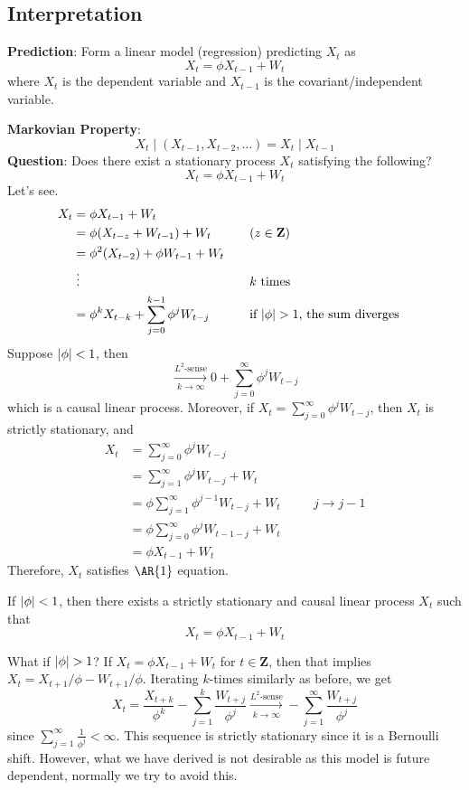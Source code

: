 \subsection*{Interpretation}
\textbf{Prediction}: Form a linear model (regression)
predicting $ X_t $ as
\[ X_t=\phi X_{t-1}+W_t \]
where $ X_t $ is the dependent variable
and $ X_{t-1} $ is the covariant/independent variable.

\textbf{Markovian Property}:
\[ X_t\mid (X_{t-1},X_{t-2},\ldots)=X_t\mid X_{t-1} \]
\textbf{Question}: Does there exist a stationary process
$ X_t $ satisfying the following?
\[ X_t=\phi X_{t-1}+W_t \]
Let's see.
\begin{align*}
    X_t
     & =\phi X_{t-1}+W_t                                                                                      \\
     & =\phi(X_{t-z}+W_{t-1})+W_t                      & \quad & (z\in\mathbf{Z})                             \\
     & =\phi^2(X_{t-2})+\phi W_{t-1}+W_t                                                                      \\
     & \;\vdots                                        & \quad & k\text{ times}                               \\
     & =\phi^k X_{t-k}+\sum_{j=0}^{k-1} \phi^j W_{t-j} & \quad & \text{if $ \lvert\phi\rvert>1 $, the sum diverges} \\
\end{align*}
Suppose $ \lvert\phi\rvert<1 $, then
\[ \xrightarrow[k\to\infty]{L^2\text{-sense}}0+
    \sum_{j=0}^{\infty} \phi^j W_{t-j} \]
which is a causal linear process. Moreover, if
$ X_t=\sum_{j=0}^{\infty} \phi^j W_{t-j} $, then
$ X_t $ is strictly stationary, and
\begin{align*}
    X_t
     & =\sum_{j=0}^{\infty} \phi^j W_{t-j}                                \\
     & =\sum_{j=1}^{\infty}\phi^j W_{t-j}+W_t                             \\
     & =\phi \sum_{j=1}^{\infty} \phi^{j-1}W_{t-j}+W_t & \quad & j\to j-1 \\
     & =\phi \sum_{j=0}^{\infty} \phi^j W_{t-1-j}+W_t                     \\
     & =\phi X_{t-1}+W_t
\end{align*}
Therefore, $ X_t $ satisfies $ \AR{1} $ equation.
\begin{Theorem}{}{}
    If $ \lvert\phi\rvert<1 $, then there exists a strictly stationary
    and causal linear process $ X_t $ such that
    \[ X_t=\phi X_{t-1}+W_t \]
\end{Theorem}
What if $ \lvert\phi\rvert>1 $? If $ X_t=\phi X_{t-1}+W_t $ for $ t\in\mathbf{Z} $,
then that implies $ X_t=X_{t+1}/\phi-W_{t+1}/\phi $. Iterating
$ k $-times similarly as before, we get
\[ X_t=\frac{X_{t+k}}{\phi^k} -\sum_{j=1}^{k} \frac{W_{t+j}}{\phi^j}
    \xrightarrow[k\to\infty]{L^2\text{-sense}}-\sum_{j=1}^{\infty} \frac{W_{t+j}}{\phi^j}   \]
since $ \sum_{j=1}^{\infty} \frac{1}{\phi^j} <\infty $.
This sequence is strictly stationary since it is a Bernoulli shift.
However, what we have derived is not desirable as this model is
future dependent, normally we try to avoid this.


